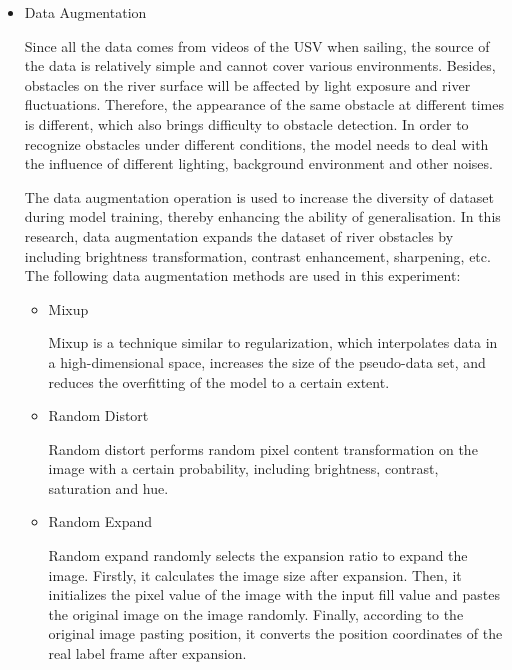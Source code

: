 \documentclass[sensors,article,submit,moreauthors,pdftex]{Definitions/mdpi}
\begin{document}
\begin{itemize}
\item{Data Augmentation}


Since all the data comes from videos of the USV when sailing, the source of the data is relatively simple and cannot cover various environments. Besides, obstacles on the river surface will be affected by light exposure and river fluctuations. Therefore, the appearance of the same obstacle at different times is different, which also brings difficulty to obstacle detection. In order to recognize obstacles under different conditions, the model needs to deal with the influence of different lighting, background environment and other noises.

The data augmentation operation is used to increase the diversity of dataset during model training, thereby enhancing the ability of generalisation. In this research, data augmentation expands the dataset of river obstacles by including brightness transformation, contrast enhancement, sharpening, etc. The following data augmentation methods are used in this experiment:



\begin{itemize}
\item{Mixup}

Mixup is a technique similar to regularization, which interpolates data in a high-dimensional space, increases the size of the pseudo-data set, and reduces the overfitting of the model to a certain extent. 
\end{itemize}


\begin{itemize}
\item{Random Distort}

Random distort performs random pixel content transformation on the image with a certain probability, including brightness, contrast, saturation and hue.

\end{itemize}

\begin{itemize}
\item{Random Expand}

Random expand randomly selects the expansion ratio to expand the image. Firstly, it calculates the image size after expansion. Then, it initializes the pixel value of the image with the input fill value and pastes the original image on the image randomly. Finally, according to the original image pasting position, it converts the position coordinates of the real label frame after expansion.


\end{itemize}
\end{itemize}
\end{document}
